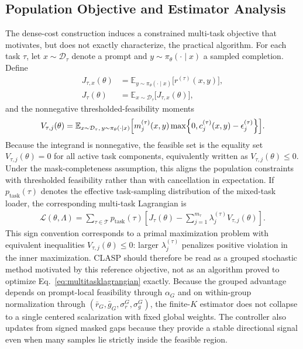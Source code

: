 \documentclass{article}
\theoremstyle{remark}
\begin{document}
\subsection{Population Objective and Estimator Analysis}
The dense-cost construction induces a constrained multi-task objective that motivates, but does not exactly characterize, the practical algorithm. For each task \(\tau\), let \(x\sim\mathcal D_\tau\) denote a prompt and \(y\sim\pi_\theta(\cdot\mid x)\) a sampled completion. Define
\begin{align}
J_{\tau,x}(\theta)
&=
\mathbb{E}_{y\sim\pi_\theta(\cdot\mid x)}\bigl[r^{(\tau)}(x,y)\bigr],
\\
J_\tau(\theta)
&=
\mathbb{E}_{x\sim\mathcal D_\tau}\bigl[J_{\tau,x}(\theta)\bigr],
\end{align}
and the nonnegative thresholded-feasibility moments
\begin{align}
V_{\tau,j}(\theta)
=
\mathbb{E}_{x\sim\mathcal D_\tau,\,y\sim\pi_\theta(\cdot\mid x)}
\Bigl[m_j^{(\tau)}(x,y)\max\!\left\{0,c_j^{(\tau)}(x,y)-\epsilon_j^{(\tau)}\right\}\Bigr].
\label{eq:positiveconstraint}
\end{align}
Because the integrand is nonnegative, the feasible set is the equality set \(V_{\tau,j}(\theta)=0\) for all active task components, equivalently written as \(V_{\tau,j}(\theta)\le 0\). Under the mask-completeness assumption, this aligns the population constraints with thresholded feasibility rather than with cancellation in expectation.
If \(p_{\mathrm{task}}(\tau)\) denotes the effective task-sampling distribution of the mixed-task loader, the corresponding multi-task Lagrangian is
\begin{align}
\mathcal L(\theta,\Lambda)
=
\sum_{\tau\in\mathcal T} p_{\mathrm{task}}(\tau)
\left[
J_\tau(\theta) - \sum_{j=1}^{m_\tau} \lambda_j^{(\tau)} V_{\tau,j}(\theta)
\right].
\label{eq:multitasklagrangian}
\end{align}
This sign convention corresponds to a primal maximization problem with equivalent inequalities \(V_{\tau,j}(\theta)\le 0\): larger \(\lambda_j^{(\tau)}\) penalizes positive violation in the inner maximization. CLASP should therefore be read as a grouped stochastic method motivated by this reference objective, not as an algorithm proved to optimize Eq.~\eqref{eq:multitasklagrangian} exactly. Because the grouped advantage depends on prompt-local feasibility through \(\alpha_G\) and on within-group normalization through \((\bar r_G,\bar g_G,\sigma_r^G,\sigma_g^G)\), the finite-\(K\) estimator does not collapse to a single centered scalarization with fixed global weights. The controller also updates from signed masked gaps because they provide a stable directional signal even when many samples lie strictly inside the feasible region.
\end{document}
